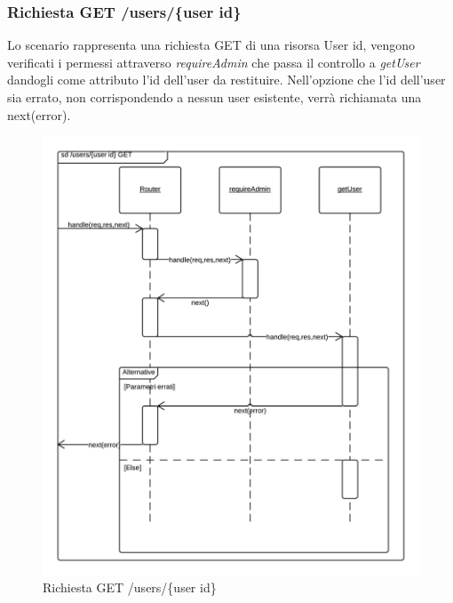 \subsubsection{Richiesta GET /users/\{user id\}} 
Lo scenario rappresenta una richiesta GET di una risorsa User id, vengono verificati i permessi attraverso \emph{requireAdmin} che passa il controllo a \emph{getUser} dandogli come attributo l'id dell'user da restituire.
Nell'opzione che l'id dell'user sia errato, non corrispondendo a nessun user esistente, verrà richiamata una next(error).
\begin{figure}[H]
	\begin{center} 
		\includegraphics[scale=0.20]{scenari/Users Id GET.png} 
		\caption{Richiesta GET /users/\{user id\}}
	\end{center} 
\end{figure}

\pagebreak
